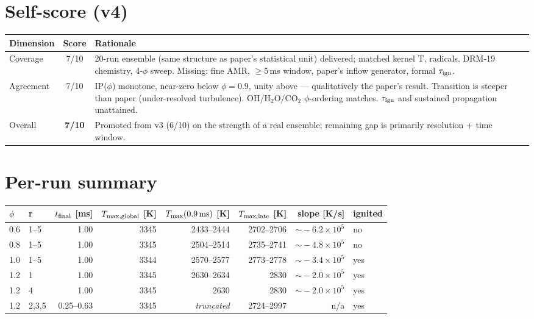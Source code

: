 \documentclass[11pt]{article}
\begin{document}
\section{Self-score (v4)}
\begin{center}
\begin{tabular}{lcp{9cm}}
\toprule
Dimension & Score & Rationale \\
\midrule
Coverage    & 7/10 & 20-run ensemble (same structure as paper's statistical
  unit) delivered; matched kernel T, radicals, DRM-19 chemistry, 4-\(\phi\)
  sweep.  Missing: fine AMR, \(\ge\!5\)\,ms window, paper's inflow generator,
  formal \(\tau_{\rm ign}\). \\
Agreement   & 7/10 & IP(\(\phi\)) monotone, near-zero below \(\phi\!=\!0.9\),
  unity above --- qualitatively the paper's result.  Transition is steeper
  than paper (under-resolved turbulence).  OH/H\(_2\)O/CO\(_2\)
  \(\phi\)-ordering matches.  \(\tau_{\rm ign}\) and sustained propagation
  unattained. \\
Overall     & \textbf{7/10} & Promoted from v3 (6/10) on the strength of a
  real ensemble; remaining gap is primarily resolution + time window. \\
\bottomrule
\end{tabular}
\end{center}

\appendix
\section{Per-run summary}\label{app:perrun}
\small
\begin{center}
\begin{tabular}{llrrrrrl}
\toprule
\(\phi\) & r & \(t_{\rm final}\) [ms] & \(T_{\max,\rm global}\) [K] &
\(T_{\max}(0.9\,{\rm ms})\) [K] & \(T_{\max,{\rm late}}\) [K] & slope [K/s] & ignited \\
\midrule
0.6 & 1--5 & 1.00 & 3345 & 2433--2444 & 2702--2706 & \(\sim\!-6.2\times10^5\) & no \\
0.8 & 1--5 & 1.00 & 3345 & 2504--2514 & 2735--2741 & \(\sim\!-4.8\times10^5\) & no \\
1.0 & 1--5 & 1.00 & 3344 & 2570--2577 & 2773--2778 & \(\sim\!-3.4\times10^5\) & yes \\
1.2 & 1    & 1.00 & 3345 & 2630--2634 & 2830       & \(\sim\!-2.0\times10^5\) & yes \\
1.2 & 4    & 1.00 & 3345 & 2630       & 2830       & \(\sim\!-2.0\times10^5\) & yes \\
1.2 & 2,3,5 & 0.25--0.63 & 3345 & \emph{truncated} & 2724--2997 & n/a & yes \\
\bottomrule
\end{tabular}
\end{center}
\end{document}

